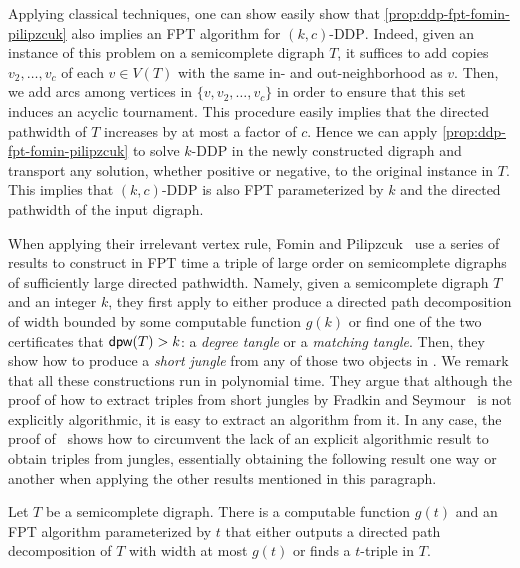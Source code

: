 \documentclass[a4paper,UKenglish,cleveref, autoref, thm-restate]{lipics-v2021}
\DeclareMathOperator{\dpw}{\text{\sf dpw}\xspace}
\renewcommand{\FPT}{{\sf FPT}\xspace}
\begin{document}
Applying classical techniques, one can show easily show that \autoref{prop:ddp-fpt-fomin-pilipzcuk} also implies an \FPT algorithm for $(k,c)$-\textsc{DDP}.
Indeed, given an instance of this problem on a semicomplete digraph $T$, it suffices to add copies $v_2, \ldots, v_c$ of each $v \in V(T)$ with the same in- and out-neighborhood as $v$. 
Then, we add arcs among vertices in $\{v, v_2, \ldots, v_c\}$ in order to ensure that this set induces an acyclic tournament.
This procedure easily implies that the directed pathwidth of $T$ increases by at most a factor of $c$. Hence we can apply \autoref{prop:ddp-fpt-fomin-pilipzcuk} to solve $k$-\textsc{DDP} in the newly constructed digraph and transport any solution, whether positive or negative, to the original instance in $T$.
This implies that $(k,c)$-\textsc{DDP} is also \FPT parameterized by $k$ and the directed pathwidth of the input digraph.

When applying their irrelevant vertex rule, Fomin and Pilipzcuk~\cite{FominP19} use a series of results to construct in \FPT time a triple of large order on semicomplete digraphs of sufficiently large directed pathwidth.
Namely, given a semicomplete digraph $T$ and an integer $k$, they first apply \cite[Theorem 4.12]{FominP19} to either produce a directed path decomposition of width bounded by some computable function $g(k)$ or find one of the two certificates that $\dpw(T) > k$: a \emph{degree tangle} or a \emph{matching tangle}.
Then, they show how to produce a \emph{short jungle} from any of those two objects in \cite[Lemmas 3.9 and 3.12]{FominP19}.
We remark that all these constructions run in polynomial time.
They argue that although the proof of how to extract triples from short jungles by Fradkin and Seymour~\cite{FradkinS13} is not explicitly algorithmic, it is easy to extract an algorithm from it.
In any case,  the proof of~\cite[Theorem 9.9]{FominP19} shows how to circumvent the lack of an explicit algorithmic result to obtain triples from jungles, essentially obtaining the following result one way or another when applying the other results mentioned in this paragraph.

\begin{proposition}\label{prop:path-decomposition-or-triple}
Let $T$ be a semicomplete digraph.
There is a computable function $g(t)$ and an \FPT algorithm parameterized by $t$ that either outputs a directed path decomposition of $T$ with width at most $g(t)$ or finds a $t$-triple in $T$.
\end{proposition}
\end{document}
